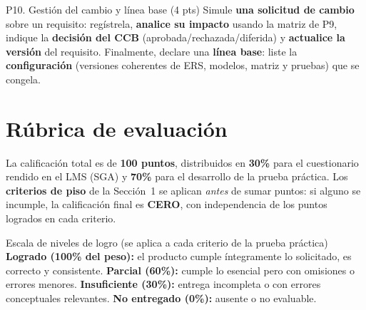 \documentclass[11pt,a4paper,oneside]{article}
\begin{document}
	
	\vspace{10pt}
	
	\begin{tarea}{P10. Gesti\'on del cambio y l\'inea base \hfill (4 pts)}
		Simule \textbf{una solicitud de cambio} sobre un requisito: reg\'istrela, \textbf{analice su impacto} usando la matriz de P9, indique la \textbf{decisi\'on del CCB} (aprobada/rechazada/diferida) y \textbf{actualice la versi\'on} del requisito. Finalmente, declare una \textbf{l\'inea base}: liste la \textbf{configuraci\'on} (versiones coherentes de ERS, modelos, matriz y pruebas) que se congela.
	\end{tarea}
	
	
	\section{R\'ubrica de evaluaci\'on}
	
	La calificaci\'on total es de \textbf{100 puntos}, distribuidos en \textbf{30\%} para el cuestionario rendido en el LMS (SGA) y \textbf{70\%} para el desarrollo de la prueba pr\'actica. Los \textbf{criterios de piso} de la Secci\'on~1 se aplican \emph{antes} de sumar puntos: si alguno se incumple, la calificaci\'on final es \textbf{CERO}, con independencia de los puntos logrados en cada criterio.
	
	\begin{concepto}{Escala de niveles de logro (se aplica a cada criterio de la prueba pr\'actica)}
		\textbf{Logrado (100\% del peso):} el producto cumple \'integramente lo solicitado, es correcto y consistente. \quad \textbf{Parcial (60\%):} cumple lo esencial pero con omisiones o errores menores. \quad \textbf{Insuficiente (30\%):} entrega incompleta o con errores conceptuales relevantes. \quad \textbf{No entregado (0\%):} ausente o no evaluable.
	\end{concepto}
	
\end{document}
